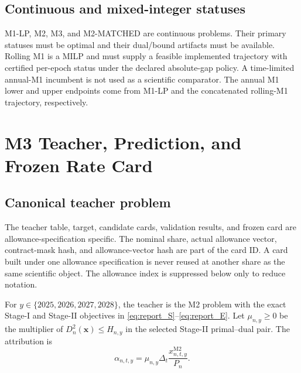 \documentclass[10pt,journal,onecolumn]{IEEEtran}
\newcommand{\Mtwo}{\ensuremath{\mathrm{M2}}}
\begin{document}
\subsection{Continuous and mixed-integer statuses}

M1-LP, M2, M3, and M2-MATCHED are continuous problems. Their primary statuses
must be optimal and their dual/bound artifacts must be available. Rolling M1
is a MILP and must supply a feasible implemented trajectory with certified
per-epoch status under the declared absolute-gap policy. A time-limited
annual-M1 incumbent is not used as a scientific comparator. The annual M1
lower and upper endpoints come from M1-LP and the concatenated rolling-M1
trajectory, respectively.

\section{M3 Teacher, Prediction, and Frozen Rate Card}
\label{sec:report_m3}

\subsection{Canonical teacher problem}

The teacher table, target, candidate cards, validation results, and frozen card
are allowance-specification specific. The nominal share, actual allowance vector,
contract-mask hash, and allowance-vector hash are part of the card ID. A card
built under one allowance specification is never reused at another share as the
same scientific object. The allowance index is suppressed below only to reduce
notation.

For $y\in\{2025,2026,2027,2028\}$, the teacher is the M2 problem with the
exact Stage-I and Stage-II objectives in
\eqref{eq:report_S}--\eqref{eq:report_E}. Let $\mu_{n,y}\geq0$ be the
multiplier of $D_n^2(\bm x)\leq H_{n,y}$ in the selected Stage-II primal--dual
pair. The attribution is
\begin{equation}
\alpha_{n,t,y}
=\mu_{n,y}\Delta_t\frac{x_{n,t,y}^{\Mtwo}}{P_n}.
\label{eq:report_alpha}
\end{equation}
\end{document}
